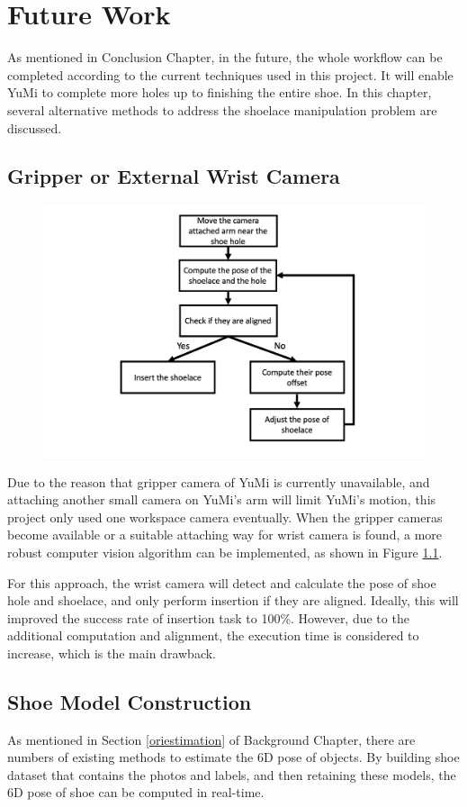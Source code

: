 \chapter{Future Work}
As mentioned in Conclusion Chapter, in the future, the whole workflow can be completed according to the current  techniques used in this project. It will enable YuMi to complete more holes up to finishing the entire shoe. In this chapter, several alternative methods to address the shoelace manipulation problem are discussed. 


\section{Gripper or External Wrist Camera} \label{futurecamera}

\begin{figure}[H]
\centering
\includegraphics[width = 0.8\columnwidth]{Futurework/feedbackcamera.png}
\caption{}
\label{feedbackcamera}
\end{figure}
Due to the reason that gripper camera of YuMi is currently unavailable, and attaching another small camera on YuMi's arm will limit YuMi's motion, this project only used one workspace camera eventually. When the gripper cameras become available or a suitable attaching way for wrist camera is found, a more robust computer vision algorithm can be implemented, as shown in Figure \ref{feedbackcamera}.

For this approach, the wrist camera will detect and calculate the pose of shoe hole and shoelace, and only perform insertion if they are aligned. Ideally, this will improved the success rate of insertion task to 100\%. However, due to the additional computation and alignment, the execution time is considered to increase, which is the main drawback. 

\section{Shoe Model Construction}
As mentioned in Section \ref{oriestimation} of Background Chapter, there are numbers of existing methods to estimate the 6D pose of objects. By building shoe dataset that contains the photos and labels, and then retaining these models, the 6D pose of shoe can be computed in real-time. 

